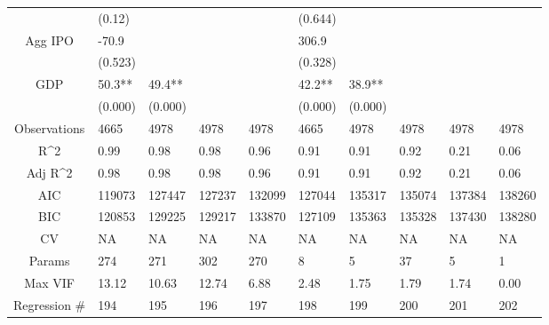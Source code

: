 \documentclass{article}
\begin{document}
\begin{table}[H]
\begin{tabular}{|clllllllll|}
   & (0.12) &  &  &  & (0.644) &  &  &  &  \\ 
  Agg IPO & -70.9 &  &  &  & 306.9 &  &  &  &  \\ 
   & (0.523) &  &  &  & (0.328) &  &  &  &  \\ 
  GDP & 50.3** & 49.4** &  &  & 42.2** & 38.9** &  &  &  \\ 
   & (0.000) & (0.000) &  &  & (0.000) & (0.000) &  &  &  \\ 
  \hline 
 Observations & 4665 & 4978 & 4978 & 4978 & 4665 & 4978 & 4978 & 4978 & 4978 \\ 
  R^2 & 0.99 & 0.98 & 0.98 & 0.96 & 0.91 & 0.91 & 0.92 & 0.21 & 0.06 \\ 
  Adj R^2 & 0.98 & 0.98 & 0.98 & 0.96 & 0.91 & 0.91 & 0.92 & 0.21 & 0.06 \\ 
  AIC & 119073 & 127447 & 127237 & 132099 & 127044 & 135317 & 135074 & 137384 & 138260 \\ 
  BIC & 120853 & 129225 & 129217 & 133870 & 127109 & 135363 & 135328 & 137430 & 138280 \\ 
  CV & NA & NA & NA & NA & NA & NA & NA & NA & NA \\ 
  Params & 274 & 271 & 302 & 270 & 8 & 5 & 37 & 5 & 1 \\ 
  Max VIF & 13.12 & 10.63 & 12.74 & 6.88 & 2.48 & 1.75 & 1.79 & 1.74 & 0.00 \\ 
  Regression \# & 194 & 195 & 196 & 197 & 198 & 199 & 200 & 201 & 202 \\ 
   \hline
\end{tabular}
 
\end{table}
\end{document}
